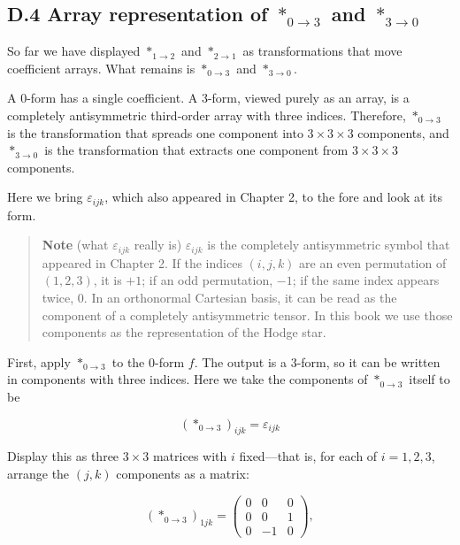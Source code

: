 \documentclass[a4paper,12pt,openany]{book}
\begin{document}
\hypertarget{d.4-array-representation-of-ast_0to3-and-ast_3to0}{%
\subsection*{\texorpdfstring{D.4 Array representation of \(\ast_{0\to3}\)
and
\(\ast_{3\to0}\)}{D.4 Array representation of \textbackslash ast\_\{0\textbackslash to3\} and \textbackslash ast\_\{3\textbackslash to0\}}}\label{d.4-array-representation-of-ast_0to3-and-ast_3to0}}

So far we have displayed \(\ast_{1\to2}\) and \(\ast_{2\to1}\) as
transformations that move coefficient arrays. What remains is
\(\ast_{0\to3}\) and \(\ast_{3\to0}\).

A \(0\)-form has a single coefficient. A \(3\)-form, viewed purely as an
array, is a completely antisymmetric third-order array with three
indices. Therefore, \(\ast_{0\to3}\) is the transformation that spreads
one component into \(3\times3\times3\) components, and \(\ast_{3\to0}\)
is the transformation that extracts one component from
\(3\times3\times3\) components.

Here we bring \(\varepsilon_{ijk}\), which also appeared in Chapter 2,
to the fore and look at its form.

\begin{quote}
\textbf{Note} (what \(\varepsilon_{ijk}\) really is)
\(\varepsilon_{ijk}\) is the completely antisymmetric symbol that
appeared in Chapter 2. If the indices \((i,j,k)\) are an even
permutation of \((1,2,3)\), it is \(+1\); if an odd permutation, \(-1\);
if the same index appears twice, \(0\). In an orthonormal Cartesian
basis, it can be read as the component of a completely antisymmetric
tensor. In this book we use those components as the representation of
the Hodge star.
\end{quote}

First, apply \(\ast_{0\to3}\) to the \(0\)-form \(f\). The output is a
\(3\)-form, so it can be written in components with three indices. Here
we take the components of \(\ast_{0\to3}\) itself to be

\[
(\ast_{0\to3})_{ijk}
=
\varepsilon_{ijk}
\]

Display this as three \(3\times3\) matrices with \(i\) fixed—that is,
for each of \(i=1,2,3\), arrange the \((j,k)\) components as a matrix:

\[
(\ast_{0\to3})_{1jk}
=
\begin{pmatrix}
0&0&0\\
0&0&1\\
0&-1&0
\end{pmatrix},
\]
\end{document}
